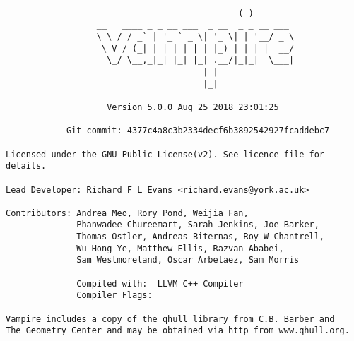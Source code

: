 \noindent
\begin{minipage}[c]{\textwidth}
\begingroup
\fontsize{7.5}{7.5}\selectfont
\begin{verbatim}
                                               _          
                                              (_)         
                  __   ____ _ _ __ ___  _ __  _ _ __ ___ 
                  \ \ / / _` | '_ ` _ \| '_ \| | '__/ _ \
                   \ V / (_| | | | | | | |_) | | | |  __/
                    \_/ \__,_|_| |_| |_| .__/|_|_|  \___|
                                       | |               
                                       |_|               

                    Version 5.0.0 Aug 25 2018 23:01:25

            Git commit: 4377c4a8c3b2334decf6b3892542927fcaddebc7

Licensed under the GNU Public License(v2). See licence file for details.

Lead Developer: Richard F L Evans <richard.evans@york.ac.uk>

Contributors: Andrea Meo, Rory Pond, Weijia Fan,
              Phanwadee Chureemart, Sarah Jenkins, Joe Barker, 
              Thomas Ostler, Andreas Biternas, Roy W Chantrell,
              Wu Hong-Ye, Matthew Ellis, Razvan Ababei, 
              Sam Westmoreland, Oscar Arbelaez, Sam Morris

              Compiled with:  LLVM C++ Compiler
              Compiler Flags: 

Vampire includes a copy of the qhull library from C.B. Barber and
The Geometry Center and may be obtained via http from www.qhull.org.

\end{verbatim}
\endgroup
\end{minipage}




